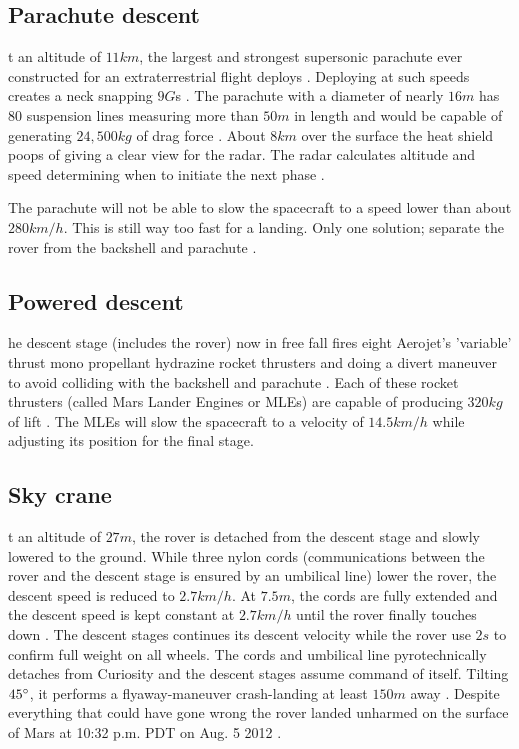 \subsection*{Parachute descent}
t an altitude of $11km$, the largest and strongest supersonic parachute ever constructed for an extraterrestrial flight deploys \cite{NASALanding} \cite{Parachute}.
Deploying at such speeds creates a neck snapping $9G$s \cite{NASA_youtube}.
The parachute with a diameter of nearly $16m$ has 80 suspension lines measuring more than $50m$ in length and would be capable of generating $24,500kg$ of drag force \cite{Parachute}.
About $8km$ over the surface the heat shield poops of giving a clear view for the radar.
The radar calculates altitude and speed determining when to initiate the next phase \cite{NASALanding}.

The parachute will not be able to slow the spacecraft to a speed lower than about $280km/h$.
This is still way too fast for a landing. Only one solution; separate the rover from the backshell and parachute \cite{NASALanding}.

\subsection*{Powered descent}
he descent stage (includes the rover) now in free fall fires eight Aerojet's 'variable' thrust mono propellant hydrazine rocket thrusters and doing a divert maneuver to avoid colliding with the backshell and parachute \cite{NASALanding} \cite{HistoricLanding}.
Each of these rocket thrusters (called Mars Lander Engines or MLEs) are capable of producing $320kg$ of lift \cite{HistoricLanding}.
The MLEs will slow the spacecraft to a velocity of $14.5km/h$ while adjusting its position for the final stage. 

\subsection*{Sky crane}
t an altitude of $27m$, the rover is detached from the descent stage and slowly lowered to the ground.
While three nylon cords (communications between the rover and the descent stage is ensured by an umbilical line) lower the rover, the descent speed is reduced to $2.7km/h$.
At $7.5m$, the cords are fully extended and the descent speed is kept constant at $2.7km/h$ until the rover finally touches down \cite{NASALanding} \cite{HistoricLanding}.
The descent stages continues its descent velocity while the rover use $2s$ to confirm full weight on all wheels.
The cords and umbilical line pyrotechnically detaches from Curiosity and the descent stages assume command of itself.
Tilting $45\degree$, it performs a flyaway-maneuver crash-landing at least $150m$ away \cite{HistoricLanding}. 
Despite everything that could have gone wrong the rover landed unharmed on the surface of Mars at 10:32 p.m. PDT on Aug. 5 2012 \cite{NASALanding}.